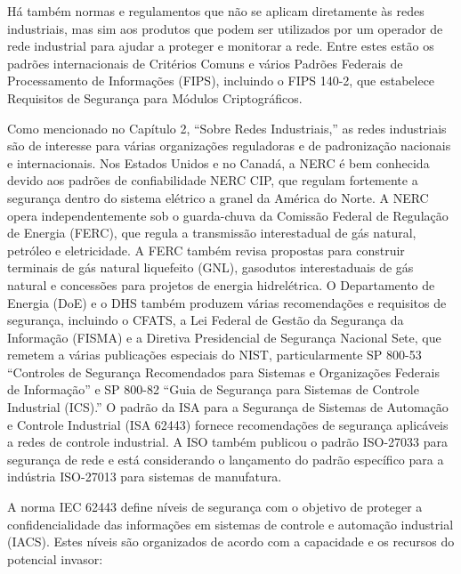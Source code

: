 Há também normas e regulamentos que não se aplicam diretamente às redes industriais, mas sim aos produtos que podem ser utilizados por um operador de rede industrial para ajudar a proteger e monitorar a rede. Entre estes estão os padrões internacionais de Critérios Comuns e vários Padrões Federais de Processamento de Informações (FIPS), incluindo o FIPS 140-2, que estabelece Requisitos de Segurança para Módulos Criptográficos.

Como mencionado no Capítulo 2, ``Sobre Redes Industriais,'' as redes industriais são de interesse para várias organizações reguladoras e de padronização nacionais e internacionais. Nos Estados Unidos e no Canadá, a NERC é bem conhecida devido aos padrões de confiabilidade NERC CIP, que regulam fortemente a segurança dentro do sistema elétrico a granel da América do Norte. A NERC opera independentemente sob o guarda-chuva da Comissão Federal de Regulação de Energia (FERC), que regula a transmissão interestadual de gás natural, petróleo e eletricidade. A FERC também revisa propostas para construir terminais de gás natural liquefeito (GNL), gasodutos interestaduais de gás natural e concessões para projetos de energia hidrelétrica. O Departamento de Energia (DoE) e o DHS também produzem várias recomendações e requisitos de segurança, incluindo o CFATS, a Lei Federal de Gestão da Segurança da Informação (FISMA) e a Diretiva Presidencial de Segurança Nacional Sete, que remetem a várias publicações especiais do NIST, particularmente SP 800-53 ``Controles de Segurança Recomendados para Sistemas e Organizações Federais de Informação'' e SP 800-82 ``Guia de Segurança para Sistemas de Controle Industrial (ICS).'' O padrão da ISA para a Segurança de Sistemas de Automação e Controle Industrial (ISA 62443) fornece recomendações de segurança aplicáveis a redes de controle industrial. A ISO também publicou o padrão ISO-27033 para segurança de rede e está considerando o lançamento do padrão específico para a indústria ISO-27013 para sistemas de manufatura.

A norma IEC 62443 define níveis de segurança com o objetivo de proteger a confidencialidade das informações em sistemas de controle e automação industrial (IACS). Estes níveis são organizados de acordo com a capacidade e os recursos do potencial invasor:

